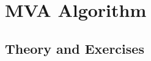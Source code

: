 
\section{MVA Algorithm}
\label{sec:mva}

\subsection*{Theory and Exercises}


\begin{comment}
\begin{exercise}[use=false]
  Assume that there are $M$ stations, each with one server. The
  service time at station $i$, $i=0,\ldots,M$ is deterministic and
  equal to $1/\mu_i$. Suppose that the routing is such that station
  $i$ sends all its output to station $i+1$, and station $M$ sends the
  jobs (cards) to station 0. Thus, the stations in this network are in
  tandem. Sketch the cycle time (also called lead time or sojourn
  time), throughput and number of jobs in queue as a function of the total number of jobs $N$ in the network.
  \begin{solution}
    TBD. See Factory Physics.
  \end{solution}
\end{exercise}
\end{comment}

